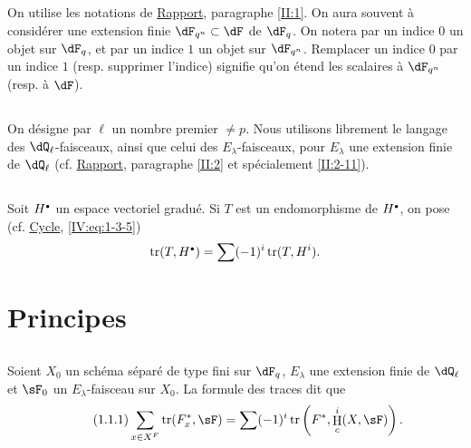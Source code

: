\documentclass[oneside]{book}
\DeclareMathOperator{\h}{H}
\DeclareMathOperator{\tr}{tr}
\theoremstyle{sga-source}
\theoremstyle{sga-source-dash}
\theoremstyle{sga-source-dotdash}
\theoremstyle{sga-source-number-note-dash}
\theoremstyle{sga-source-note-number-dotdash}
\theoremstyle{sga-source-example-dotdash}
\theoremstyle{sga-source-inline-number}
\theoremstyle{sga-source-bare-number}
\theoremstyle{sga-source}
\let\oldbullet\bullet
\renewcommand{\bullet}{\textnormal{\tiny$\oldbullet$}}
\begin{document}
\subsection{}\label{VI:0-1}

On utilise les notations de \hyperref[II]{Rapport}, paragraphe \ref{II:1}. On 
aura souvent à considérer une extension finie $\dF_{q^n}\subset \dF$ de 
$\dF_q$. On notera par un indice $0$ un objet sur $\dF_q$, et par un indice $1$ 
un objet sur $\dF_{q^n}$. Remplacer un indice $0$ par un indice $1$ (resp. 
supprimer l'indice) signifie qu'on étend les scalaires à $\dF_{q^n}$ (resp. 
à $\dF$).





\subsection{}\label{VI:0-2}

On désigne par $\ell$ un nombre premier $\ne p$. Nous utilisons librement le 
langage des $\dQ_\ell$-faisceaux, ainsi que celui des $E_\lambda$-faisceaux, 
pour $E_\lambda$ une extension finie de $\dQ_\ell$ (cf. \hyperref[II]{Rapport}, 
paragraphe \ref{II:2} et spécialement \ref{II:2-11}). 





\subsection{}\label{VI:0-3}

Soit $H^\bullet$ un espace vectoriel gradué. Si $T$ est un endomorphisme de 
$H^\bullet$, on pose (cf. \hyperref[IV]{Cycle}, \ref{IV:eq:1-3-5}) 
\[
  \tr(T,H^\bullet) = \sum (-1)^i \tr(T,H^i) \text{.}
\]










\section{Principes}\label{VI:1}





\subsection{}\label{VI:1-1}

Soient $X_0$ un schéma séparé de type fini sur $\dF_q$, $E_\lambda$ une 
extension finie de $\dQ_\ell$ et $\sF_0$ un $E_\lambda$-faisceau sur $X_0$. La 
formule des traces dit que 
\begin{equation*}\tag{1.1.1}\label{VI:eq:1-1-1}
  \sum_{x\in X^F} \tr(F_x^\ast,\sF) = \sum (-1)^i \tr\left(F^\ast,\h_c^i(X,\sF)\right) \text{.}
\end{equation*}
\end{document}
